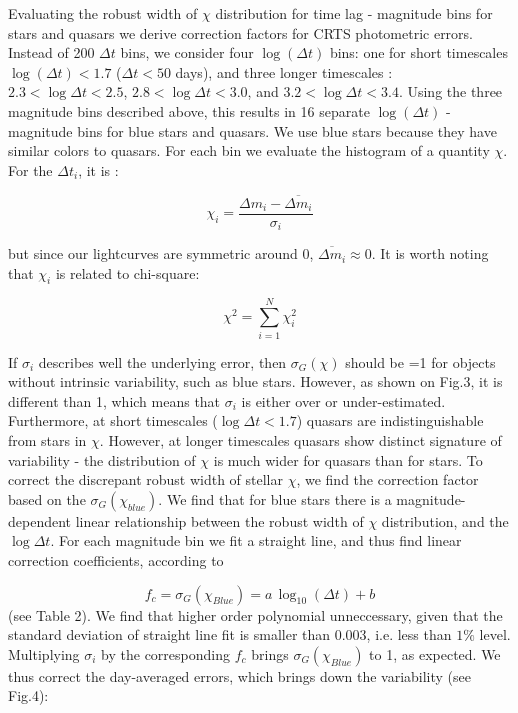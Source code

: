 \documentclass[fleqn,usenatbib]{mnras}  %
\begin{document}
Evaluating the robust width of $\chi$ distribution for time lag - magnitude bins for stars and quasars we derive correction factors for CRTS photometric errors. Instead of 200 $\Delta t$ bins,  we consider four $\log (\Delta t ) $ bins: one for short timescales  $\log (\Delta t ) < 1.7$ ($\Delta t < 50$ days), and three longer timescales : $2.3<\log{\Delta t}<2.5$, $2.8<\log{\Delta t}<3.0$, and $3.2<\log{\Delta t}<3.4$. Using the three magnitude bins described above, this results in 16 separate $\log(\Delta t)$ - magnitude bins for blue stars and quasars. We use blue stars because they have similar colors to quasars. For each bin we evaluate the histogram of a quantity $\chi$. For the  $\Delta t_{i}$, it is :

\begin{equation}
\chi_{i} = \frac{\Delta m_{i} - \overline{\Delta m_{i}}}{\sigma_{i}}
\end{equation}

but since our lightcurves are symmetric around 0, $\overline{\Delta m_{i}} \approx 0$. 
It is worth noting that $\chi_{i}$ is related to chi-square: 

\begin{equation}
\chi^{2} = \sum_{i=1}^{N}{\chi_{i}^{2}}
\end{equation}

If $\sigma_{i}$ describes well the underlying error, then $\sigma_{G}(\chi)$ should be =1 for objects without intrinsic variability, such as blue stars. However, as shown on Fig.3, it is different than 1, which means that $\sigma_{i}$ is either over or under-estimated. Furthermore, at short timescales ($\log{\Delta t} < 1.7$) quasars are indistinguishable from stars in $\chi$. However, at longer timescales quasars show distinct signature of variability - the distribution of $\chi$ is much wider for quasars than for stars. To correct the discrepant robust width of stellar $\chi$, we find the correction factor based on the $\sigma_{G}(\chi_{blue})$.  We find that for blue stars there is a magnitude-dependent  linear relationship between the robust width of $\chi$ distribution, and the $\log{\Delta t}$. For each magnitude bin we fit a straight line, and thus find linear correction coefficients, according to 

\begin{equation}
\label{eq:fc}
f_{c} = \sigma_{G}(\chi_{Blue}) = a  \, \log_{10}(\Delta t) + b
\end{equation}
(see Table 2). We find that higher order polynomial unneccessary, given that the standard deviation of straight line fit is smaller than  0.003, i.e. less than $1\%$ level. 
Multiplying  $\sigma_{i}$ by the corresponding $f_{c}$ brings  $\sigma_{G}(\chi_{Blue})$ to 1, as expected. We thus correct the day-averaged errors, which brings down the variability (see Fig.4):
\end{document}
